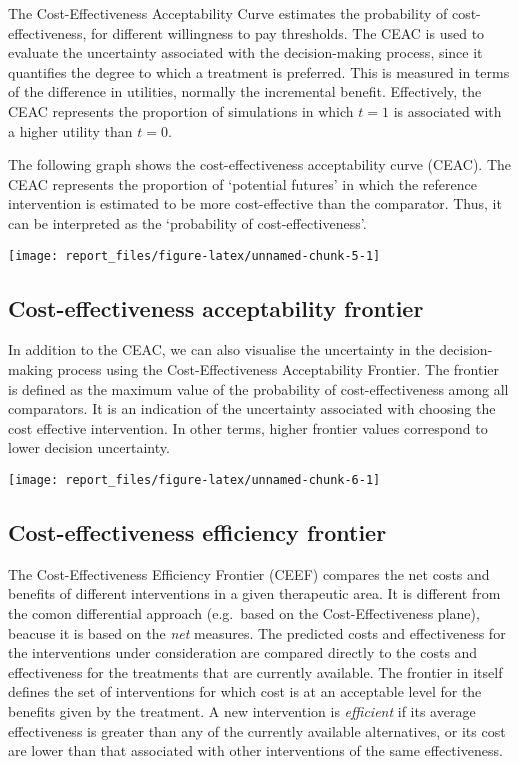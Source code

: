\documentclass[]{article}
\begin{document}
The Cost-Effectiveness Acceptability Curve estimates the probability of
cost-effectiveness, for different willingness to pay thresholds. The
CEAC is used to evaluate the uncertainty associated with the
decision-making process, since it quantifies the degree to which a
treatment is preferred. This is measured in terms of the difference in
utilities, normally the incremental benefit. Effectively, the CEAC
represents the proportion of simulations in which \(t=1\) is associated
with a higher utility than \(t=0\).

The following graph shows the cost-effectiveness acceptability curve
(CEAC). The CEAC represents the proportion of `potential futures' in
which the reference intervention is estimated to be more cost-effective
than the comparator. Thus, it can be interpreted as the `probability of
cost-effectiveness'.

\begin{center}\texttt{[image: report\_files/figure-latex/unnamed-chunk-5-1]} \end{center}

\subsection{Cost-effectiveness acceptability
frontier}\label{cost-effectiveness-acceptability-frontier}

In addition to the CEAC, we can also visualise the uncertainty in the
decision-making process using the Cost-Effectiveness Acceptability
Frontier. The frontier is defined as the maximum value of the
probability of cost-effectiveness among all comparators. It is an
indication of the uncertainty associated with choosing the cost
effective intervention. In other terms, higher frontier values
correspond to lower decision uncertainty.

\begin{center}\texttt{[image: report\_files/figure-latex/unnamed-chunk-6-1]} \end{center}

\subsection{Cost-effectiveness efficiency
frontier}\label{cost-effectiveness-efficiency-frontier}

The Cost-Effectiveness Efficiency Frontier (CEEF) compares the net costs
and benefits of different interventions in a given therapeutic area. It
is different from the comon differential approach (e.g.~based on the
Cost-Effectiveness plane), beacuse it is based on the \emph{net}
measures. The predicted costs and effectiveness for the interventions
under consideration are compared directly to the costs and effectiveness
for the treatments that are currently available. The frontier in itself
defines the set of interventions for which cost is at an acceptable
level for the benefits given by the treatment. A new intervention is
\emph{efficient} if its average effectiveness is greater than any of the
currently available alternatives, or its cost are lower than that
associated with other interventions of the same effectiveness.
\end{document}
